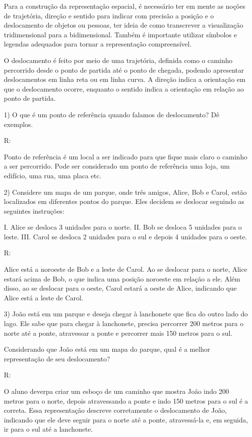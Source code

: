 Para a construção da representação espacial, é necessário ter em mente
as noções de trajetória, direção e sentido para indicar com precisão a
posição e o deslocamento de objetos ou pessoas, ter ideia de como
transcrever a visualização tridimensional para a bidimensional. Também é
importante utilizar símbolos e legendas adequados para tornar a
representação compreensível.

O deslocamento é feito por meio de uma trajetória, definida como o
caminho percorrido desde o ponto de partida até o ponto de chegada,
podendo apresentar deslocamentos em linha reta ou em linha curva. A
direção indica a orientação em que o deslocamento ocorre, enquanto o
sentido indica a orientação em relação ao ponto de partida.


1) O que é um ponto de referência quando falamos de deslocamento? Dê
exemplos.

R:

Ponto de referência é um local a ser indicado para que fique mais claro
o caminho a ser percorrido. Pode ser considerado um ponto de referência
uma loja, um edifício, uma rua, uma placa etc.

2) Considere um mapa de um parque, onde três amigos, Alice, Bob e Carol,
estão localizados em diferentes pontos do parque. Eles decidem se
deslocar seguindo as seguintes instruções:

I. Alice se desloca 3 unidades para o norte. II. Bob se desloca 5
unidades para o leste. III. Carol se desloca 2 unidades para o sul e
depois 4 unidades para o oeste.

R:

Alice está a noroeste de Bob e a leste de Carol. Ao se deslocar para o
norte, Alice estará acima de Bob, o que indica uma posição noroeste em
relação a ele. Além disso, ao se deslocar para o oeste, Carol estará a
oeste de Alice, indicando que Alice está a leste de Carol.

3) João está em um parque e deseja chegar à lanchonete que fica do outro
lado do lago. Ele sabe que para chegar à lanchonete, precisa percorrer
200 metros para o norte até a ponte, atravessar a ponte e percorrer mais
150 metros para o sul.

Considerando que João está em um mapa do parque, qual é a melhor
representação de seu deslocamento?

R:

O aluno deverpa criar um esboço de um caminho que mostra João indo 200
metros para o norte, depois atravessando a ponte e indo 150 metros para
o sul é a correta. Essa representação descreve corretamente o
deslocamento de João, indicando que ele deve seguir para o norte até a
ponte, atravessá-la e, em seguida, ir para o sul até a lanchonete.

